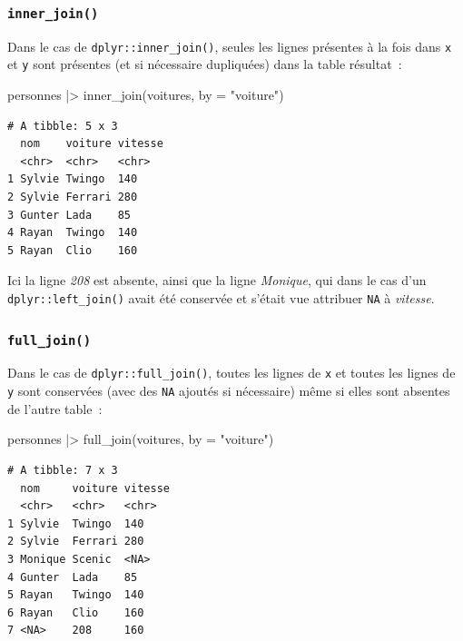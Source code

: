 \documentclass[
  letterpaper,
  DIV=11,
  numbers=noendperiod,
  oneside]{scrreprt}
\newenvironment{Shaded}{\begin{snugshade}}{\end{snugshade}}
\newcommand{\AttributeTok}[1]{\textcolor[rgb]{0.40,0.45,0.13}{#1}}
\newcommand{\FunctionTok}[1]{\textcolor[rgb]{0.28,0.35,0.67}{#1}}
\newcommand{\NormalTok}[1]{\textcolor[rgb]{0.00,0.23,0.31}{#1}}
\newcommand{\SpecialCharTok}[1]{\textcolor[rgb]{0.37,0.37,0.37}{#1}}
\newcommand{\StringTok}[1]{\textcolor[rgb]{0.13,0.47,0.30}{#1}}
\begin{document}
\hypertarget{inner_join}{%
\subsubsection{\texorpdfstring{\texttt{inner\_join()}}{inner\_join()}}\label{inner_join}}

Dans le cas de \texttt{dplyr::inner\_join()}, seules les lignes
présentes à la fois dans \texttt{x} et \texttt{y} sont présentes (et si
nécessaire dupliquées) dans la table résultat~:

\begin{Shaded}
\begin{Highlighting}[]
\NormalTok{personnes }\SpecialCharTok{|\textgreater{}} \FunctionTok{inner\_join}\NormalTok{(voitures, }\AttributeTok{by =} \StringTok{"voiture"}\NormalTok{)}
\end{Highlighting}
\end{Shaded}

\begin{verbatim}
# A tibble: 5 x 3
  nom    voiture vitesse
  <chr>  <chr>   <chr>  
1 Sylvie Twingo  140    
2 Sylvie Ferrari 280    
3 Gunter Lada    85     
4 Rayan  Twingo  140    
5 Rayan  Clio    160    
\end{verbatim}

Ici la ligne \emph{208} est absente, ainsi que la ligne \emph{Monique},
qui dans le cas d'un \texttt{dplyr::left\_join()} avait été conservée et
s'était vue attribuer \texttt{NA} à \emph{vitesse}.

\hypertarget{full_join}{%
\subsubsection{\texorpdfstring{\texttt{full\_join()}}{full\_join()}}\label{full_join}}

Dans le cas de \texttt{dplyr::full\_join()}, toutes les lignes de
\texttt{x} et toutes les lignes de \texttt{y} sont conservées (avec des
\texttt{NA} ajoutés si nécessaire) même si elles sont absentes de
l'autre table~:

\begin{Shaded}
\begin{Highlighting}[]
\NormalTok{personnes }\SpecialCharTok{|\textgreater{}} \FunctionTok{full\_join}\NormalTok{(voitures, }\AttributeTok{by =} \StringTok{"voiture"}\NormalTok{)}
\end{Highlighting}
\end{Shaded}

\begin{verbatim}
# A tibble: 7 x 3
  nom     voiture vitesse
  <chr>   <chr>   <chr>  
1 Sylvie  Twingo  140    
2 Sylvie  Ferrari 280    
3 Monique Scenic  <NA>   
4 Gunter  Lada    85     
5 Rayan   Twingo  140    
6 Rayan   Clio    160    
7 <NA>    208     160    
\end{verbatim}
\end{document}
